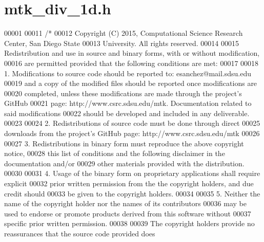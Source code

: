 \hypertarget{mtk__div__1d_8h_source}{\section{mtk\+\_\+div\+\_\+1d.\+h}
\label{mtk__div__1d_8h_source}
}

\begin{DoxyCode}
00001 
00011 \textcolor{comment}{/*}
00012 \textcolor{comment}{Copyright (C) 2015, Computational Science Research Center, San Diego State}
00013 \textcolor{comment}{University. All rights reserved.}
00014 \textcolor{comment}{}
00015 \textcolor{comment}{Redistribution and use in source and binary forms, with or without modification,}
00016 \textcolor{comment}{are permitted provided that the following conditions are met:}
00017 \textcolor{comment}{}
00018 \textcolor{comment}{1. Modifications to source code should be reported to: esanchez@mail.sdsu.edu}
00019 \textcolor{comment}{and a copy of the modified files should be reported once modifications are}
00020 \textcolor{comment}{completed, unless these modifications are made through the project's GitHub}
00021 \textcolor{comment}{page: http://www.csrc.sdsu.edu/mtk. Documentation related to said modifications}
00022 \textcolor{comment}{should be developed and included in any deliverable.}
00023 \textcolor{comment}{}
00024 \textcolor{comment}{2. Redistributions of source code must be done through direct}
00025 \textcolor{comment}{downloads from the project's GitHub page: http://www.csrc.sdsu.edu/mtk}
00026 \textcolor{comment}{}
00027 \textcolor{comment}{3. Redistributions in binary form must reproduce the above copyright notice,}
00028 \textcolor{comment}{this list of conditions and the following disclaimer in the documentation and/or}
00029 \textcolor{comment}{other materials provided with the distribution.}
00030 \textcolor{comment}{}
00031 \textcolor{comment}{4. Usage of the binary form on proprietary applications shall require explicit}
00032 \textcolor{comment}{prior written permission from the the copyright holders, and due credit should}
00033 \textcolor{comment}{be given to the copyright holders.}
00034 \textcolor{comment}{}
00035 \textcolor{comment}{5. Neither the name of the copyright holder nor the names of its contributors}
00036 \textcolor{comment}{may be used to endorse or promote products derived from this software without}
00037 \textcolor{comment}{specific prior written permission.}
00038 \textcolor{comment}{}
00039 \textcolor{comment}{The copyright holders provide no reassurances that the source code provided does}

\end{DoxyCode}
